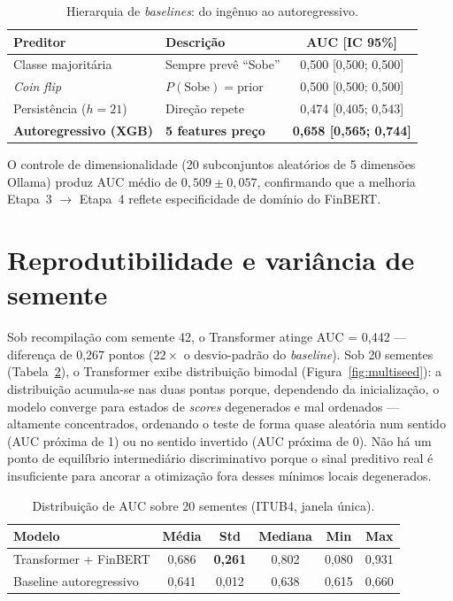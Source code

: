 \begin{table}[htb]
\centering
\caption{Hierarquia de \textit{baselines}: do ingênuo ao autoregressivo.}\label{tab:naive}
\begin{tabular}{llc}
\toprule
\textbf{Preditor} & \textbf{Descrição} & \textbf{AUC [IC 95\%]} \\
\midrule
Classe majoritária     & Sempre prevê ``Sobe''           & 0,500 [0,500; 0,500] \\
\textit{Coin flip}     & $P(\text{Sobe}) = \text{prior}$ & 0,500 [0,500; 0,500] \\
Persistência ($h=21$)  & Direção repete                  & 0,474 [0,405; 0,543] \\
\textbf{Autoregressivo (XGB)} & \textbf{5 features preço} & \textbf{0,658 [0,565; 0,744]} \\
\bottomrule
\end{tabular}
\end{table}

O controle de dimensionalidade (20 subconjuntos aleatórios de 5 dimensões Ollama) produz AUC médio de $0{,}509 \pm 0{,}057$, confirmando que a melhoria Etapa~3 $\to$ Etapa~4 reflete especificidade de domínio do FinBERT.

\section{Reprodutibilidade e variância de semente}

Sob recompilação com semente 42, o Transformer atinge AUC = 0,442 --- diferença de 0,267 pontos ($22\times$ o desvio-padrão do \textit{baseline}). Sob 20 sementes (Tabela~\ref{tab:multiseed}), o Transformer exibe distribuição bimodal (Figura~\ref{fig:multiseed}): a distribuição acumula-se nas duas pontas porque, dependendo da inicialização, o modelo converge para estados de \textit{scores} degenerados e mal ordenados --- altamente concentrados, ordenando o teste de forma quase aleatória num sentido (AUC próxima de 1) ou no sentido invertido (AUC próxima de 0). Não há um ponto de equilíbrio intermediário discriminativo porque o sinal preditivo real é insuficiente para ancorar a otimização fora desses mínimos locais degenerados.

\begin{table}[htb]
\centering
\caption{Distribuição de AUC sobre 20 sementes (ITUB4, janela única).}\label{tab:multiseed}
\begin{tabular}{lccccc}
\toprule
\textbf{Modelo} & \textbf{Média} & \textbf{Std} & \textbf{Mediana} & \textbf{Min} & \textbf{Max} \\
\midrule
Transformer + FinBERT       & 0,686 & \textbf{0,261} & 0,802 & 0,080 & 0,931 \\
Baseline autoregressivo     & 0,641 & 0,012           & 0,638 & 0,615 & 0,660 \\
\bottomrule
\end{tabular}
\end{table}

